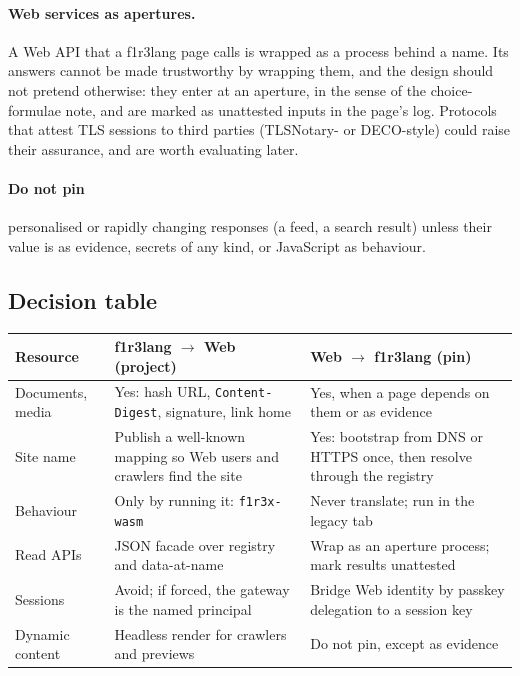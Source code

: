 \documentclass[11pt]{article}
\theoremstyle{definition}
\theoremstyle{remark}
\newcommand{\fl}{f1r3lang}
\newcommand{\code}[1]{\texttt{#1}}
\begin{document}
\paragraph{Web services as apertures.} A Web API that a \fl{} page calls is wrapped as a
process behind a name. Its answers cannot be made trustworthy by wrapping them, and the
design should not pretend otherwise: they enter at an aperture, in the sense of the
choice-formulae note, and are marked as unattested inputs in the page's log. Protocols
that attest TLS sessions to third parties (TLSNotary- or DECO-style) could raise their
assurance, and are worth evaluating later.

\paragraph{Do not pin} personalised or rapidly changing responses (a feed, a search
result) unless their value is as evidence, secrets of any kind, or JavaScript as
behaviour.

\subsection{Decision table}

\begin{center}
\small
\renewcommand{\arraystretch}{1.2}
\begin{tabularx}{\linewidth}{@{}>{\raggedright\arraybackslash}p{2.8cm}>{\raggedright\arraybackslash}X>{\raggedright\arraybackslash}X@{}}
\toprule
Resource & \fl{} $\to$ Web (project) & Web $\to$ \fl{} (pin)\\
\midrule
Documents, media & Yes: hash URL, \code{Content-Digest}, signature, link home & Yes, when a page depends on them or as evidence\\
Site name & Publish a well-known mapping so Web users and crawlers find the site & Yes: bootstrap from DNS or HTTPS once, then resolve through the registry\\
Behaviour & Only by running it: \code{f1r3x-wasm} & Never translate; run in the legacy tab\\
Read APIs & JSON facade over registry and data-at-name & Wrap as an aperture process; mark results unattested\\
Sessions & Avoid; if forced, the gateway is the named principal & Bridge Web identity by passkey delegation to a session key\\
Dynamic content & Headless render for crawlers and previews & Do not pin, except as evidence\\
\bottomrule
\end{tabularx}
\end{center}
\end{document}
